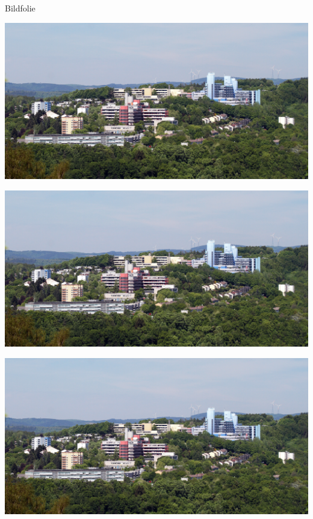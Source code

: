 \documentclass[aspectratio=169, table]{beamer}
\begin{document}
\begin{frame}{Bildfolie}
	\begin{minipage}{.31\textwidth}
		\includegraphics[width=\textwidth]{img/progress.jpg}
		
	\end{minipage}
	\hfill
	\begin{minipage}{.31\textwidth}
		\includegraphics[width=\textwidth]{img/progress.jpg}
		
	\end{minipage}
	\hfill
	\begin{minipage}{.31\textwidth}
		\includegraphics[width=\textwidth]{img/progress.jpg}
		
	\end{minipage}
\end{frame}
\end{document}
